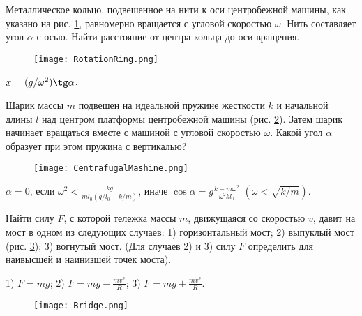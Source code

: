 \begin{ex} %
Металлическое кольцо, подвешенное на нити к оси центробежной машины, как указано на рис. \ref{RotationRing}, равномерно вращается с угловой скоростью $\omega$. Нить составляет угол $\alpha$ с осью. Найти расстояние от центра кольца до оси вращения.

\begin{figure}
\centering
\texttt{[image: RotationRing.png]}
\caption{}
\label{RotationRing}
\end{figure}

\begin{ans}
$x = (g/\omega^2) \tg \alpha$.
\end{ans}
\end{ex}	


\begin{ex} %
Шарик массы $m$ подвешен на идеальной пружине жесткости $	k$ и начальной длины $l$ над центром платформы центробежной машины (рис. \ref{CentrafugalMashine}). Затем шарик начинает вращаться вместе с машиной с угловой скоростью $\omega$. Какой угол $\alpha$ образует при этом пружина с вертикалью?

\begin{figure}[h]
\centering
\texttt{[image: CentrafugalMashine.png]}
\caption{}
\label{CentrafugalMashine}
\end{figure}

\begin{ans}
$\alpha = 0$, если $\omega^2 < \frac{kg}{ml_0(g/l_0 + k/m)}$, иначе $\cos \alpha = g\frac{k-m\omega^2}{\omega^2kl_0}$ $\left( \omega < \sqrt{k/m} \right)$.
\end{ans}
\end{ex}	

\begin{ex} %
Найти силу $F$, с которой тележка массы $m$, движущаяся со скоростью $v$, давит на мост в одном из следующих случаев: 1) горизонтальный мост; 2) выпуклый мост (рис. \ref{Bridge}); 3) вогнутый мост. (Для случаев 2) и 3) силу $F$ определить для наивысшей и наинизшей точек моста).
\begin{ans}
1) $F=mg$; 2) $F=mg-\frac{mv^2}{R}$; 3) $F=mg+\frac{mv^2}{R}$.
\end{ans}
\end{ex}	

\begin{figure}[h]
\centering
\texttt{[image: Bridge.png]}
\caption{}
\label{Bridge}
\end{figure}

